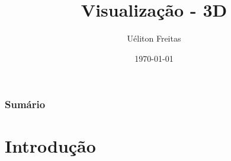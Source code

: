 \documentclass{beamer}
\title[Computação Gráfica]{Visualização - 3D} %
\author{Uéliton Freitas} %
\institute[UFMS] %
{
Universidade Católica Don Bosco - UCDB \\ %
\medskip
\textit{freitas.ueliton@gmail.com} %
}
\date{\today} %
\begin{document}
\begin{frame}
\titlepage %
\end{frame}

\begin{frame}
\frametitle{Sumário} %
\tableofcontents %
\end{frame}





\section{Introdução} 

\end{document}
